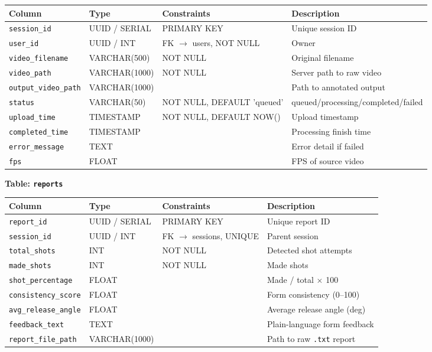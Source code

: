 ﻿\documentclass[11pt,a4paper]{article}
\begin{document}
\begin{longtable}{|L{3.2cm}|L{3cm}|L{2.8cm}|L{5cm}|}
\hline
\textbf{Column} & \textbf{Type} & \textbf{Constraints} & \textbf{Description} \\ \hline
\texttt{session\_id} & UUID / SERIAL & PRIMARY KEY & Unique session ID \\ \hline
\texttt{user\_id} & UUID / INT & FK $\to$ users, NOT NULL & Owner \\ \hline
\texttt{video\_filename} & VARCHAR(500) & NOT NULL & Original filename \\ \hline
\texttt{video\_path} & VARCHAR(1000) & NOT NULL & Server path to raw video \\ \hline
\texttt{output\_video\_path} & VARCHAR(1000) & & Path to annotated output \\ \hline
\texttt{status} & VARCHAR(50) & NOT NULL, DEFAULT 'queued' & queued/processing/completed/failed \\ \hline
\texttt{upload\_time} & TIMESTAMP & NOT NULL, DEFAULT NOW() & Upload timestamp \\ \hline
\texttt{completed\_time} & TIMESTAMP & & Processing finish time \\ \hline
\texttt{error\_message} & TEXT & & Error detail if failed \\ \hline
\texttt{fps} & FLOAT & & FPS of source video \\ \hline
\end{longtable}

\textbf{Table: \texttt{reports}}

\begin{longtable}{|L{3.2cm}|L{3cm}|L{2.8cm}|L{5cm}|}
\hline
\textbf{Column} & \textbf{Type} & \textbf{Constraints} & \textbf{Description} \\ \hline
\texttt{report\_id} & UUID / SERIAL & PRIMARY KEY & Unique report ID \\ \hline
\texttt{session\_id} & UUID / INT & FK $\to$ sessions, UNIQUE & Parent session \\ \hline
\texttt{total\_shots} & INT & NOT NULL & Detected shot attempts \\ \hline
\texttt{made\_shots} & INT & NOT NULL & Made shots \\ \hline
\texttt{shot\_percentage} & FLOAT & & Made / total $\times$ 100 \\ \hline
\texttt{consistency\_score} & FLOAT & & Form consistency (0--100) \\ \hline
\texttt{avg\_release\_angle} & FLOAT & & Average release angle (deg) \\ \hline
\texttt{feedback\_text} & TEXT & & Plain-language form feedback \\ \hline
\texttt{report\_file\_path} & VARCHAR(1000) & & Path to raw \texttt{.txt} report \\ \hline
\end{longtable}
\end{document}
